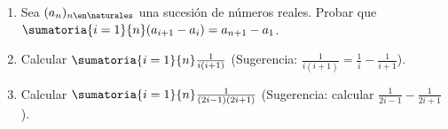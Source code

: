 \ejercicio
\def\suma1n{\sumatoria{i = 1}{n}}
\def\paraAlinear{\text{\phantom{$ \suma1n \frac{1}{(2i-1)(2i+1)}$}}\overset{\phantom{Aux.1}}{=}}


\begin{enumerate}[label=\roman*)]
	\item Sea $(a_n)_{n \en \naturales }$ una sucesión de números reales.
	      Probar que $ \suma1n(a_{i+1} - a_i) = a_{n+1} - a_1$.

	\item Calcular $ \suma1n \frac{1}{i(i+1)}$ \quad (Sugerencia: $ \frac{1}{i(i+1)} = \frac{1}{i} - \frac{1}{i+1}$).

	\item Calcular $ \suma1n\frac{1}{(2i-1)(2i+1)}$ \quad (Sugerencia: calcular $ \frac{1}{2i-1} - \frac{1}{2i+1}$).
\end{enumerate}

